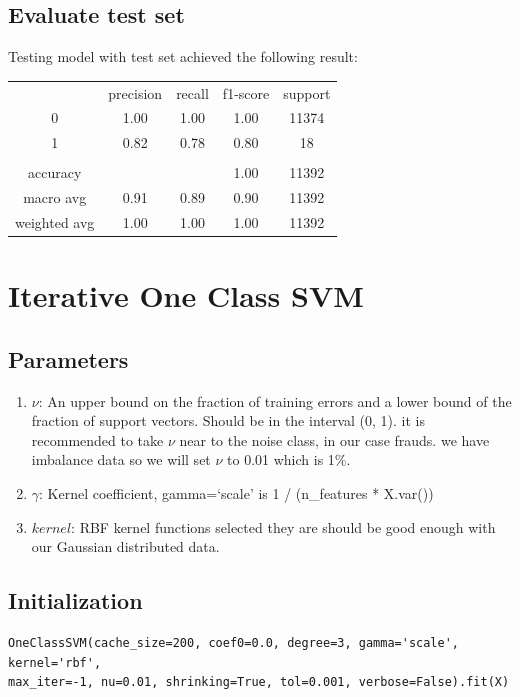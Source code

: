 \documentclass[20pt,a4paper]{article}
\begin{document}
\subsection{Evaluate test set}
    Testing model with test set achieved the following result:
                
    \begin{center}
        \begin{tabular}{ c c c c c}
          & precision & recall & f1-score &  support\\ 
         0 & 1.00 & 1.00 & 1.00 & 11374\\
         1 & 0.82 & 0.78 & 0.80 & 18\\
         \\
         accuracy & & & 1.00 & 11392\\
         macro avg & 0.91 & 0.89 & 0.90 & 11392\\
         weighted avg & 1.00 & 1.00 & 1.00 & 11392
        \end{tabular}
    \end{center}

\section{Iterative One Class SVM}
\subsection{Parameters}
\begin{enumerate}[label=\roman*)]
\item
  $\nu$: An upper bound on the fraction of training errors and a
  lower bound of the fraction of support vectors. Should be in the
  interval (0, 1). it is recommended to take $\nu$ near to the noise
  class, in our case frauds. we have imbalance data so we will set $\nu$ to
  0.01 which is 1\%.
\item
  $\gamma$: Kernel coefficient, gamma=`scale' is 1 / (n\_features * X.var())
\item
  $kernel$: RBF kernel functions selected they are should be good
  enough with our Gaussian distributed data.
\end{enumerate}

\subsection{Initialization}
\begin{verbatim}
OneClassSVM(cache_size=200, coef0=0.0, degree=3, gamma='scale', kernel='rbf',
max_iter=-1, nu=0.01, shrinking=True, tol=0.001, verbose=False).fit(X) 
\end{verbatim}
        
\end{document}
